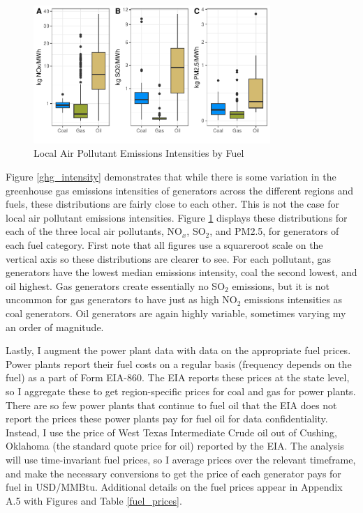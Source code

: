 \begin{figure}
    \centering
    \caption{Local Air Pollutant Emissions Intensities by Fuel\label{pol_intensities}}
    \includegraphics[width=0.8\textwidth]{figures/chapter5_figures/local_poll_EI.pdf}
\end{figure}

Figure \ref{ghg_intensity} demonstrates that while there is some variation in the greenhouse gas emissions intensities of generators across the different regions and fuels, these distributions are fairly close to each other. This is not the case for local air pollutant emissions intensities. Figure \ref{pol_intensities} displays these distributions for each of the three local air pollutants, NO$_x$, SO$_2$, and PM2.5, for generators of each fuel category. First note that all figures use a squareroot scale on the vertical axis so these distributions are clearer to see. For each pollutant, gas generators have the lowest median emissions intensity, coal the second lowest, and oil highest. Gas generators create essentially no SO$_2$ emissions, but it is not uncommon for gas generators to have just as high NO$_2$ emissions intensities as coal generators. Oil generators are again highly variable, sometimes varying my an order of magnitude. 

Lastly, I augment the power plant data with data on the appropriate fuel prices. Power plants report their fuel costs on a regular basis (frequency depends on the fuel) as a part of Form EIA-860. The EIA reports these prices at the state level, so I aggregate these to get region-specific prices for coal and gas for power plants. There are so few power plants that continue to fuel oil that the EIA does not report the prices these power plants pay for fuel oil for data confidentiality. Instead, I use the price of West Texas Intermediate Crude oil out of Cushing, Oklahoma (the standard quote price for oil) reported by the EIA. The analysis will use time-invariant fuel prices, so I average prices over the relevant timeframe, and make the necessary conversions to get the price of each generator pays for fuel in USD/MMBtu. Additional details on the fuel prices appear in Appendix A.5 with Figures and Table \ref{fuel_prices}.

